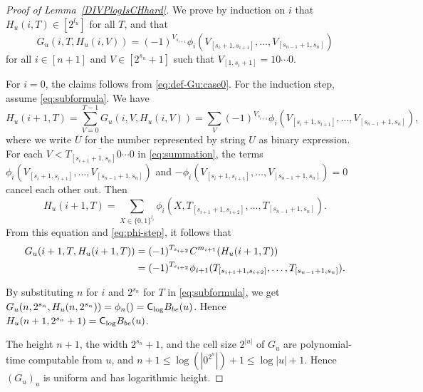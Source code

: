 \begin{proof}[\textup{Proof of Lemma~\ref{DIVPlogIsCHhard}}]
We prove by induction on $i$ that $H_u(i, T) \in [2^{l_u}]$ for all $T$, and that
 \begin{equation} \label{eq:subformula}
  G_u(i,T,H_u(i,V)) = (-1)^{V_{s_{i+1}}} 
   \phi_i(V_{[s_i+1, s_{i+1}]}, \dots, V_{[s_{n-1}+1, s_n]})
 \end{equation}
for all $i \in [n+1]$ and $V \in [2^{s_n}+1]$
such that $V_{[1, s_i +1]} = 10 \cdots 0$.

For $i=0$, the claims follows from \eqref{eq:def-Gu:case0}.
For the induction step, assume \eqref{eq:subformula}. 
We have
 \begin{equation} \label{eq:summation}
  H_u(i+1, T) 
  = \sum_{V = 0}^{T-1} G_u(i, V, H_u(i, V)) 
  = \sum_{V} (-1)^{V_{s_{i+1}}} \phi_i(V_{[s_i+1, s_{i+1}]}, 
   \dots, V_{[s_{n-1}+1, s_n]}),
 \end{equation}
where we write $\overline U$ for the number represented by string $U$ as binary expression.
For each $V < \overline{T_{[s_{i+1}+1, s_n]} 0 \cdots 0}$ in \eqref{eq:summation},
the terms $\phi_i(V_{[s_i+1, s_{i+1}]}, \dots, V_{[s_{n-1}+1, s_n]})$ and
 $- \phi_i(V_{[s_i+1, s_{i+1}]}, \dots, V_{[s_{n-1}+1, s_n]}) = 0$ cancel each other out. Then 
 \begin{equation}
  H_u(i+1, T) = \sum_{X \in \{0,1\}^{l_i}}
  \phi_i(X, T_{[s_{i+1}+1, s_{i+2}]}, \dots, T_{[s_{n-1}+1, s_n]}).
 \end{equation}
 From this equation and \eqref{eq:phi-step}, it follows that
 \begin{align}
  G_u(i+1,T,H_u(i+1,T)) 
  &= (-1)^{T_{s_{i+2}}} C^{m_{i+1}} (H_u(i+1, T))
\notag
\\
  &= (-1)^{T_{s_{i+2}}} \phi_{i+1}(T_{[s_{i+1}+1, s_{i+2}]}, \dots, T_{[s_{n-1}+1, s_n]}).
 \end{align}


By substituting $n$ for $i$ and $2^{s_n}$ for $T$ in \eqref{eq:subformula},
we get $G_u(n, 2^{s_n}, H_u(n,2^{s_n})) = \phi_n() = \mathsf{C}_{\log} B_{be}(u)$.
Hence $H_u(n+1, 2^{s_n}+1) = \mathsf{C}_{\log} B_{be}(u)$.
 
The height $n+1$, the width $2^{s_n}+1$, and the cell size $2^{|u|}$
of $G_u$ are polynomial-time computable from $u$, 
and $n+1 \le \log(|0^{2^n}|) + 1 \le \log|u| + 1$.
Hence $(G_u)_u$ is uniform and has logarithmic height. 
\end{proof}


